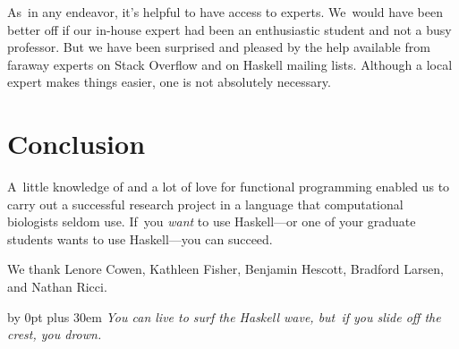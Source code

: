 \documentclass[preprint,nonatbib,blockstyle,nocopyrightspace,times]{sigplanconf}
\begin{document}
As~in any endeavor, it's helpful to have access to experts.
We~would have been better off if our in-house expert had been an
enthusiastic student and not a busy professor.
But we have been surprised and pleased by the help available from
faraway experts on Stack Overflow and on Haskell mailing lists.
Although a local expert makes things easier, one is not
 absolutely necessary.


\section{Conclusion}

A~little knowledge of and a lot of love for functional programming
enabled us to carry out a successful research project in a language
that computational biologists seldom use.
If~you \emph{want} to use Haskell---or one of your graduate students
wants to use Haskell---you can
succeed. 




%  

 

\ifnotcutting
\acks

We thank Lenore Cowen, Kathleen Fisher, Benjamin Hescott, Bradford
Larsen, and Nathan Ricci. 
\fi







\iffinaldraft


\vfill

\begingroup
\parfillskip=0pt
\advance\leftskip by 0pt plus 30em
\emph{You can live to surf the Haskell wave, but~if you slide off the crest, you
drown.}
\par
\endgroup

\fi

\end{document}
